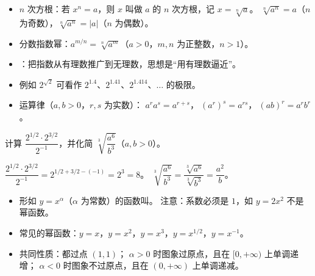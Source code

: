 \begin{explore}
\begin{itemize}
  \item $n$ 次方根：若 $x^n=a$，则 $x$ 叫做 $a$ 的 $n$ 次方根，记 $x=\sqrt[n]{a}$。
        $\sqrt[n]{a^n}=a$（$n$ 为奇数），$\sqrt[n]{a^n}=|a|$（$n$ 为偶数）。
  \item 分数指数幂：$a^{m/n}=\sqrt[n]{a^m}$（$a>0$，$m,n$ 为正整数，$n>1$）。
  \item {}：把指数从有理数推广到无理数，思想是“用有理数逼近”。
  \item 例如 $2^{\sqrt2}$ 可看作 $2^{1.4}$、$2^{1.41}$、$2^{1.414}$、$\dots$ 的极限。
  \item 运算律（$a,b>0$，$r,s$ 为实数）：
        $a^r a^s=a^{r+s}$，$\ (a^r)^s=a^{rs}$，$\ (ab)^r=a^r b^r$。
\end{itemize}

\begin{example}
计算 $\dfrac{2^{1/2}\cdot2^{3/2}}{2^{-1}}$，并化简 $\sqrt[3]{\dfrac{a^6}{b^3}}$（$a,b>0$）。
\end{example}
\begin{solution}
$\dfrac{2^{1/2}\cdot2^{3/2}}{2^{-1}}=2^{1/2+3/2-(-1)}=2^{3}=8$。
$\sqrt[3]{\dfrac{a^6}{b^3}}=\dfrac{\sqrt[3]{a^6}}{\sqrt[3]{b^3}}=\dfrac{a^2}{b}$。
\end{solution}

\begin{itemize}
  \item 形如 $y=x^{\alpha}$（$\alpha$ 为常数）的函数叫。
        注意：系数必须是 $1$，如 $y=2x^2$ 不是幂函数。
  \item 常见的幂函数：$y=x$，$y=x^2$，$y=x^3$，$y=x^{1/2}$，$y=x^{-1}$。
  \item 共同性质：都过点 $(1,1)$；
        $\alpha>0$ 时图象过原点，且在 $[0,+\infty)$ 上单调递增；
        $\alpha<0$ 时图象不过原点，且在 $(0,+\infty)$ 上单调递减。
\end{itemize}


\end{explore}
